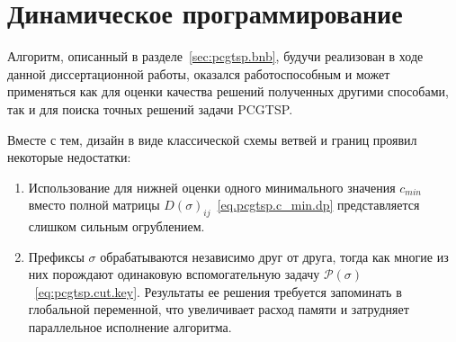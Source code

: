 
\section{Динамическое программирование}
\label{sec:pcgtsp.dp}

Алгоритм, описанный в разделе~\ref{sec:pcgtsp.bnb},
будучи реализован в ходе данной диссертационной работы,
оказался работоспособным и может применяться как
для оценки качества решений полученных другими способами,
так и для поиска точных решений задачи PCGTSP.

Вместе с тем, дизайн в виде классической схемы ветвей и границ
проявил некоторые недостатки:

\begin{enumerate}
  \item
  Использование для нижней оценки
  одного минимального значения
  $c_{min}$
  вместо полной матрицы
  $D(\sigma)_{ij}$~\eqref{eq.pcgtsp.c_min.dp}
  представляется слишком сильным огрублением.
  \item
  Префиксы $\sigma$ обрабатываются независимо друг от друга,
  тогда как многие из них порождают
  одинаковую вспомогательную задачу
  $\mathcal P(\sigma)$~\eqref{eq:pcgtsp.cut.key}.
  Результаты ее решения требуется запоминать в глобальной переменной,
  что увеличивает расход памяти и затрудняет
  параллельное исполнение алгоритма.
\end{enumerate}
